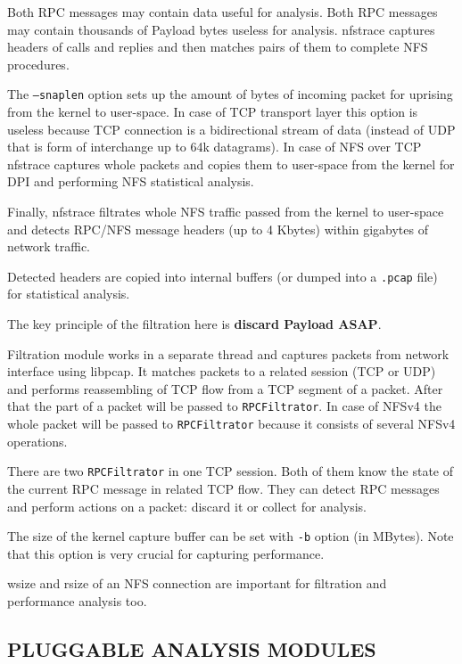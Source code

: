 \documentclass[oneside]{article}
\newcommand{\code}[1]{\texttt{#1}}
\newcommand{\gls}{}
\newcommand*{\textfile}[1]{\textsf{#1}}
\newcommand*{\textprog}[1]{\textfile{#1}}
\begin{document}
Both RPC messages may contain data useful for analysis. Both RPC messages may
contain thousands of \gls{Payload} bytes useless for analysis. nfstrace
captures headers of calls and replies and then matches pairs of them to
complete \gls{NFS} procedures.

The \code{--snaplen} option sets up the amount of bytes of incoming packet for
uprising from the kernel to user-space. In case of TCP transport layer this
option is useless because TCP connection is a bidirectional stream of data
(instead of UDP that is form of interchange up to 64k datagrams). In case of
\gls{NFS} over TCP \textprog{nfstrace} captures whole packets and copies them to
user-space from the kernel for \gls{DPI} and performing \gls{NFS} statistical
analysis.

Finally, \textprog{nfstrace} filtrates whole \gls{NFS} traffic passed from the kernel to
user-space and detects RPC/NFS message headers (up to 4 Kbytes) within
gigabytes of network traffic.

Detected headers are copied into internal buffers (or dumped into a
\code{.pcap} file) for statistical analysis.

The key principle of the filtration here is \textbf{discard \gls{Payload}
ASAP}.

Filtration module works in a separate thread and captures packets from network
interface using libpcap. It matches packets to a related session (TCP or UDP)
and performs reassembling of TCP flow from a TCP segment of a packet. After
that the part of a packet will be passed to \code{RPCFiltrator}. In case of NFSv4 the
whole packet will be passed to \code{RPCFiltrator} because it consists of several
NFSv4 operations.  

There are two \code{RPCFiltrator} in one TCP session. Both of them
know the state of the current RPC message in related TCP flow. They can detect
RPC messages and perform actions on a packet: discard it or collect for
analysis.

The size of the kernel capture buffer can be set with \code{-b} option (in
MBytes).  Note that this option is very crucial for capturing performance.

\gls{wsize} and \gls{rsize} of an \gls{NFS} connection are important for
filtration and performance analysis too.

\subsection{PLUGGABLE ANALYSIS MODULES}
\end{document}
